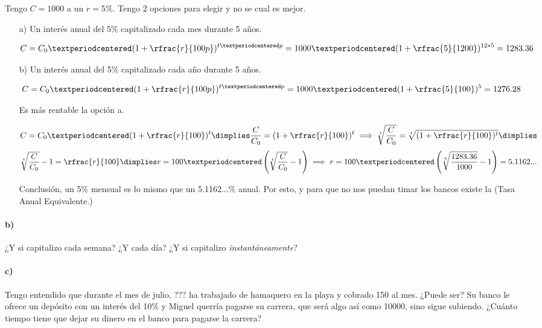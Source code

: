 \begin{example}

Tengo $C= 1000$ a un $r=5\%$. Tengo 2 opciones para elegir y no se cual es mejor. 

\begin{itemize}
	\item[a)] Un interés anual del 5\% capitalizado cada mes durante 5 años.

	\[
		C = C_0·(1+\rfrac{r}{100p})^{t·p} = 1000·(1+\rfrac{5}{1200})^{12*5} = 1283.36
	\]
	\item[b)] Un interés anual del 5\% capitalizado cada año durante 5 años.

	\[
		C = C_0·(1+\rfrac{r}{100p})^{t·p} = 1000·(1+\rfrac{5}{100})^{5} = 1276.28
	\]

	Es más rentable la opción a. 


	\[
		C = C_0·(1+\rfrac{r}{100})^{t} \dimplies \frac{C}{C_0} = (1+\rfrac{r}{100})^t \implies \sqrt[t]{\frac{C}{C_0}} = \sqrt[t]{(1+\rfrac{r}{100})^t} \dimplies
	\]
	\[
 		\sqrt[t]{\frac{C}{C_0}} -1 = \rfrac{r}{100} \dimplies r = 100·\left(\sqrt[t]{\frac{C}{C_0}} -1 \right)\implies r = 100·\left(\sqrt[5]{\frac{1283.36}{1000}} - 1\right) = 5.1162...
	\]

	Conclusión, un 5\% mensual es lo mismo que un 5.1162...\% anual. Por esto, y para que no nos puedan timar los bancos existe la  (Tasa Anual Equivalente.)


\end{itemize}
\end{example}

\paragraph{b)}
¿Y si capitalizo cada semana? ¿Y cada día? ¿Y si capitalizo \textit{instantáneamente}? 

\paragraph{c)}
Tengo entendido que durante el mes de julio, ??? ha trabajado de hamaquero en la playa y cobrado 150 al mes. ¿Puede ser? Su banco le ofrece un depósito con un interés del 10\% y Miguel querría pagarse su carrera, que será algo así como 10000, sino sigue subiendo.
%
¿Cuánto tiempo tiene que dejar su dinero en el banco para pagarse la carrera?

